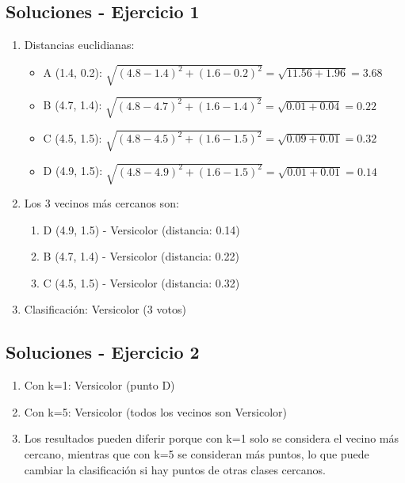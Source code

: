 \documentclass[12pt]{article}
\begin{document}
\subsection{Soluciones - Ejercicio 1}

\begin{enumerate}
    \item Distancias euclidianas:
    \begin{itemize}
        \item A (1.4, 0.2): $\sqrt{(4.8-1.4)^2 + (1.6-0.2)^2} = \sqrt{11.56 + 1.96} = 3.68$
        \item B (4.7, 1.4): $\sqrt{(4.8-4.7)^2 + (1.6-1.4)^2} = \sqrt{0.01 + 0.04} = 0.22$
        \item C (4.5, 1.5): $\sqrt{(4.8-4.5)^2 + (1.6-1.5)^2} = \sqrt{0.09 + 0.01} = 0.32$
        \item D (4.9, 1.5): $\sqrt{(4.8-4.9)^2 + (1.6-1.5)^2} = \sqrt{0.01 + 0.01} = 0.14$
    \end{itemize}
    
    \item Los 3 vecinos más cercanos son:
    \begin{enumerate}
        \item D (4.9, 1.5) - Versicolor (distancia: 0.14)
        \item B (4.7, 1.4) - Versicolor (distancia: 0.22)
        \item C (4.5, 1.5) - Versicolor (distancia: 0.32)
    \end{enumerate}
    
    \item Clasificación: Versicolor (3 votos)
\end{enumerate}

\subsection{Soluciones - Ejercicio 2}

\begin{enumerate}
    \item Con k=1: Versicolor (punto D)
    \item Con k=5: Versicolor (todos los vecinos son Versicolor)
    \item Los resultados pueden diferir porque con k=1 solo se considera el vecino más cercano, mientras que con k=5 se consideran más puntos, lo que puede cambiar la clasificación si hay puntos de otras clases cercanos.
\end{enumerate}
\end{document}
